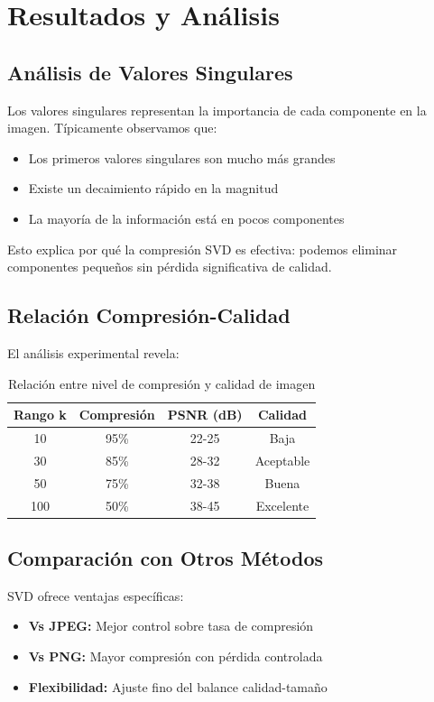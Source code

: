 \documentclass[12pt,a4paper]{article}
\begin{document}
	\section{Resultados y Análisis}
	
	\subsection{Análisis de Valores Singulares}
	
	Los valores singulares representan la importancia de cada componente en la imagen. Típicamente observamos que:
	\begin{itemize}
		\item Los primeros valores singulares son mucho más grandes
		\item Existe un decaimiento rápido en la magnitud
		\item La mayoría de la información está en pocos componentes
	\end{itemize}
	
	Esto explica por qué la compresión SVD es efectiva: podemos eliminar componentes pequeños sin pérdida significativa de calidad.
	
	\subsection{Relación Compresión-Calidad}
	
	El análisis experimental revela:
	
	\begin{table}[H]
		\centering
		\begin{tabular}{|c|c|c|c|}
			\hline
			\textbf{Rango k} & \textbf{Compresión} & \textbf{PSNR (dB)} & \textbf{Calidad} \\
			\hline
			10 & 95\% & 22-25 & Baja \\
			30 & 85\% & 28-32 & Aceptable \\
			50 & 75\% & 32-38 & Buena \\
			100 & 50\% & 38-45 & Excelente \\
			\hline
		\end{tabular}
		\caption{Relación entre nivel de compresión y calidad de imagen}
	\end{table}
	
	\subsection{Comparación con Otros Métodos}
	
	SVD ofrece ventajas específicas:
	\begin{itemize}
		\item \textbf{Vs JPEG:} Mejor control sobre tasa de compresión
		\item \textbf{Vs PNG:} Mayor compresión con pérdida controlada
		\item \textbf{Flexibilidad:} Ajuste fino del balance calidad-tamaño
	\end{itemize}
	
\end{document}
